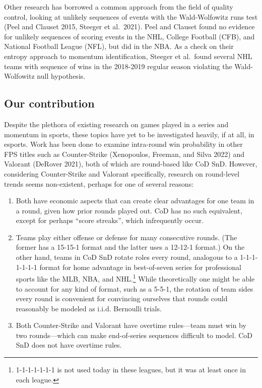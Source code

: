 \documentclass{article}
\providecommand{\tightlist}{%
  \setlength{\itemsep}{0pt}\setlength{\parskip}{0pt}}
\begin{document}
Other research has borrowed a common approach from the field of quality
control, looking at unlikely sequences of events with the Wald-Wolfowitz
runs test (Peel and Clauset 2015, Steeger et al.~2021). Peel and Clauset
found no evidence for unlikely sequences of scoring events in the NHL,
College Football (CFB), and National Football League (NFL), but did in
the NBA. As a check on their entropy approach to momentum
identification, Steeger et al.~found several NHL teams with sequence of
wins in the 2018-2019 regular season violating the Wald-Wolfowitz null
hypothesis.

\hypertarget{our-contribution}{%
\subsection{Our contribution}\label{our-contribution}}

Despite the plethora of existing research on games played in a series
and momentum in sports, these topics have yet to be investigated
heavily, if at all, in esports. Work has been done to examine
intra-round win probability in other FPS titles such as Counter-Strike
(Xenopoulos, Freeman, and Silva 2022) and Valorant (DeRover 2021), both
of which are round-based like CoD SnD. However, considering
Counter-Strike and Valorant specifically, research on round-level trends
seems non-existent, perhaps for one of several reasons:

\begin{enumerate}
\def\labelenumi{\arabic{enumi}.}
\tightlist
\item
  Both have economic aspects that can create clear advantages for one
  team in a round, given how prior rounds played out. CoD has no such
  equivalent, except for perhaps ``score streaks'', which infrequently
  occur.
\item
  Teams play either offense or defense for many consecutive rounds. (The
  former has a 15-15-1 format and the latter uses a 12-12-1 format.) On
  the other hand, teams in CoD SnD rotate roles every round, analogous
  to a 1-1-1-1-1-1-1 format for home advantage in best-of-seven series
  for professional sports like the MLB, NBA, and NHL.\footnote{1-1-1-1-1-1-1
    is not used today in these leagues, but it was at least once in each
    league.} While theoretically one might be able to account for any
  kind of format, such as a 5-5-1, the rotation of team sides every
  round is convenient for convincing ourselves that rounds could
  reasonably be modeled as i.i.d. Bernoulli trials.
\item
  Both Counter-Strike and Valorant have overtime rules---team must win
  by two rounds---which can make end-of-series sequences difficult to
  model. CoD SnD does not have overtime rules.
\end{enumerate}
\end{document}
